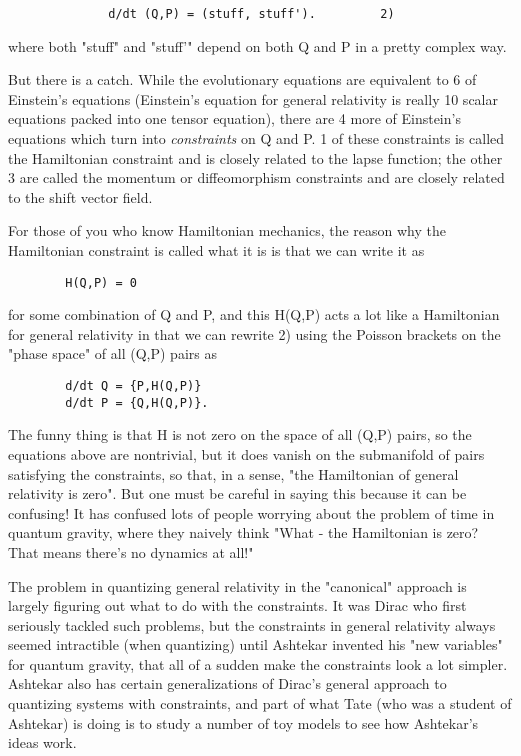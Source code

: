 \begin{verbatim}
              d/dt (Q,P) = (stuff, stuff').			2)
\end{verbatim}
    
where both "stuff" and "stuff'" depend on both Q and P in a pretty
complex way.  

But there is a catch.  While the evolutionary equations are equivalent
to 6 of Einstein's equations (Einstein's equation for general relativity
is really 10 scalar equations packed into one tensor equation), there
are 4 more of Einstein's equations which turn into \emph{constraints} on Q
and P.  1 of these constraints is called the Hamiltonian constraint and
is closely related to the lapse function; the other 3 are called the
momentum or diffeomorphism constraints and are closely related to the
shift vector field.  

For those of you who know Hamiltonian mechanics, the reason why the
Hamiltonian constraint is called what it is is that we can write it as 

\begin{verbatim}
		H(Q,P) = 0
\end{verbatim}
    
for some combination of Q and P, and this H(Q,P) acts a lot like a
Hamiltonian for general relativity in that we can rewrite 2) using the
Poisson brackets on the "phase space" of all (Q,P) pairs as

\begin{verbatim}
		d/dt Q = {P,H(Q,P)}
		d/dt P = {Q,H(Q,P)}.
\end{verbatim}
    
The funny thing is that H is not zero on the space of all (Q,P) pairs,
so the equations above are nontrivial, but it does vanish on the submanifold
of pairs satisfying the constraints, so that, in a sense, "the
Hamiltonian of general relativity is zero".  But one must be careful in
saying this because it can be confusing!  It has confused lots of people
worrying about the problem of time in quantum gravity, where they
naively think "What - the Hamiltonian is zero?  That means there's no
dynamics at all!"

The problem in quantizing general relativity in the "canonical" approach
is largely figuring out what to do with the constraints.  It was Dirac
who first seriously tackled such problems, but the constraints in
general relativity always seemed intractible (when quantizing) until
Ashtekar invented his "new variables" for quantum gravity, that all of a
sudden make the constraints look a lot simpler.  Ashtekar also has
certain generalizations of Dirac's general approach to quantizing
systems with constraints, and part of what Tate (who was a student of
Ashtekar) is doing is to study a number of toy models to see how
Ashtekar's ideas work.

